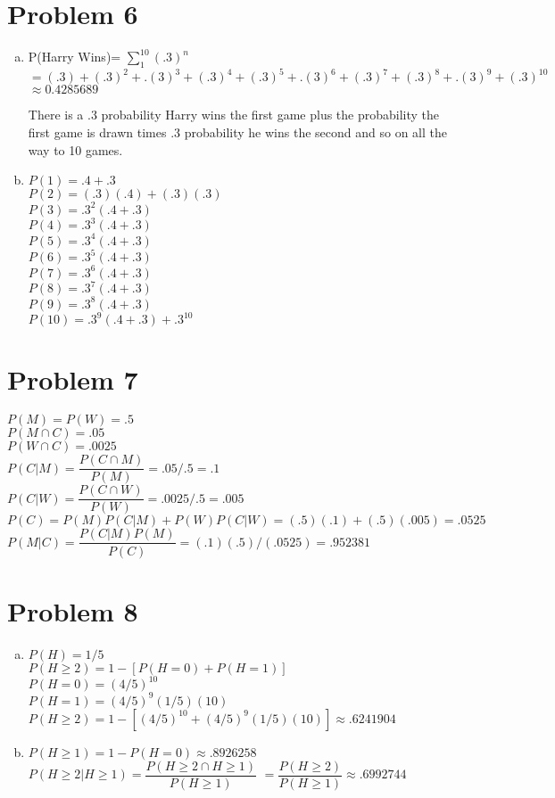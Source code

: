 \documentclass{article}
\begin{document}
\begin{flushleft}
\section*{Problem 6}
\begin{enumerate}[(a)]
\item
P(Harry Wins)= $\sum_{1}^{10}(.3)^n$\medbreak $=(.3)+(.3)^2+.(3)^3+(.3)^4+(.3)^5+.(3)^6+(.3)^7+(.3)^8+.(3)^9+(.3)^{10}$\\
$\approx 0.4285689$ \medbreak

There is a .3 probability Harry wins the first game plus the probability the first game is drawn times .3 probability he wins the second and so on all the way to 10 games.
\item
$P(1)=.4+.3$\\
$P(2)=(.3)(.4)+(.3)(.3)$\\
$P(3)=.3^2(.4+.3)$\\
$P(4)=.3^3(.4+.3)$\\
$P(5)=.3^4(.4+.3)$\\
$P(6)=.3^5(.4+.3)$\\
$P(7)=.3^6(.4+.3)$\\
$P(8)=.3^7(.4+.3)$\\
$P(9)=.3^8(.4+.3)$\\
$P(10)=.3^9(.4+.3)+.3^{10}$\\
\end{enumerate}
\section*{Problem 7}
$P(M)=P(W)=.5$\\
$P(M\cap C)=.05$\\
$P(W \cap C)=.0025$\\
$P(C|M)=\dfrac{P(C\cap M)}{P(M)}=.05/.5=.1$\\
$P(C|W)=\dfrac{P(C\cap W)}{P(W)}=.0025/.5=.005$\\
$P(C)=P(M)P(C|M)+P(W)P(C|W)=(.5)(.1)+(.5)(.005)=.0525$\medbreak
$P(M|C)=\dfrac{P(C|M)P(M)}{P(C)}=(.1)(.5)/(.0525)=.952381$
\section*{Problem 8}
\begin{enumerate}[(a)]
\item	
$P(H)=1/5$\\
$P(H\geq 2)=1-[P(H=0)+P(H=1)]$\\
$P(H=0)=(4/5)^{10}$\\
$P(H=1)=(4/5)^9(1/5)(10)$\\
$P(H\geq 2)=1-[(4/5)^{10}+(4/5)^9(1/5)(10)]\approx .6241904$
\item
$P(H \geq 1)=1-P(H=0)\approx .8926258$\medbreak
$P(H\geq 2|H \geq 1)=\dfrac{P(H\geq 2 \cap H \geq 1)}{P(H\geq 1)}$\medbreak
$=\dfrac{P(H\geq 2)}{P(H \geq 1)}\approx.6992744$
\end{enumerate}

\end{flushleft}
\end{document}
